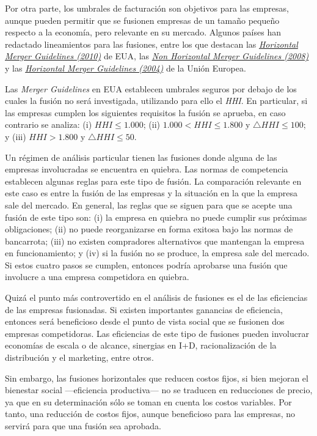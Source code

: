 \documentclass[
  12pt,
  spanish,
]{book}
\begin{document}
Por otra parte, los umbrales de facturación son objetivos para las empresas, aunque pueden permitir que se fusionen empresas de un tamaño pequeño respecto a la economía, pero relevante en su mercado. Algunos países han redactado lineamientos para las fusiones, entre los que destacan las \href{https://www.ftc.gov/sites/default/files/attachments/merger-review/100819hmg.pdf}{\emph{Horizontal Merger Guidelines (2010)}} de EUA, las \href{https://eur-lex.europa.eu/LexUriServ/LexUriServ.do?uri=OJ:C:2008:265:0006:0025:en:PDF}{\emph{Non Horizontal Merger Guidelines (2008)}} y las \href{https://eur-lex.europa.eu/legal-content/EN/TXT/PDF/?uri=CELEX:52004XC0205(02)\&from=EN}{\emph{Horizontal Merger Guidelines (2004)}} de la Unión Europea.

Las \emph{Merger Guidelines} en EUA establecen umbrales seguros por debajo de los cuales la fusión no será investigada, utilizando para ello el \emph{HHI}. En particular, si las empresas cumplen los siguientes requisitos la fusión se aprueba, en caso contrario se analiza: (i) \(HHI \leq 1.000\); (ii) \(1.000 < HHI \leq 1.800\) y \(\bigtriangleup HHI \leq 100\); y (iii) \(HHI > 1.800\) y \(\bigtriangleup HHI \leq 50\).

Un régimen de análisis particular tienen las fusiones donde alguna de las empresas involucradas se encuentra en quiebra. Las normas de competencia establecen algunas reglas para este tipo de fusión. La comparación relevante en este caso es entre la fusión de las empresas y la situación en la que la empresa sale del mercado. En general, las reglas que se siguen para que se acepte una fusión de este tipo son: (i) la empresa en quiebra no puede cumplir sus próximas obligaciones; (ii) no puede reorganizarse en forma exitosa bajo las normas de bancarrota; (iii) no existen compradores alternativos que mantengan la empresa en funcionamiento; y (iv) si la fusión no se produce, la empresa sale del mercado. Si estos cuatro pasos se cumplen, entonces podría aprobarse una fusión que involucre a una empresa competidora en quiebra.

Quizá el punto más controvertido en el análisis de fusiones es el de las eficiencias de las empresas fusionadas. Si existen importantes ganancias de eficiencia, entonces será beneficioso desde el punto de vista social que se fusionen dos empresas competidoras. Las eficiencias de este tipo de fusiones pueden involucrar economías de escala o de alcance, sinergias en I+D, racionalización de la distribución y el marketing, entre otros.

Sin embargo, las fusiones horizontales que reducen costos fijos, si bien mejoran el bienestar social ---eficiencia productiva--- no se traducen en reducciones de precio, ya que en su determinación sólo se toman en cuenta los costos variables. Por tanto, una reducción de costos fijos, aunque beneficioso para las empresas, no servirá para que una fusión sea aprobada.
\end{document}
